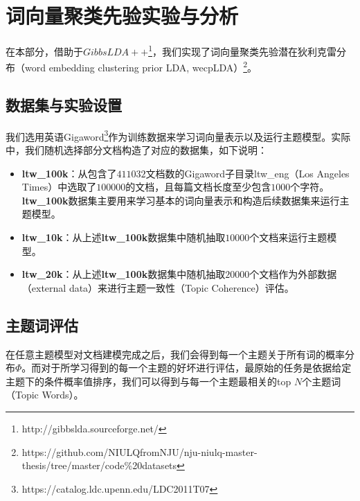 \documentclass[master]{njuthesis}
\begin{document}
\section{词向量聚类先验实验与分析}\label{sec_exp_priorLDA_chap5}

在本部分，借助于$GibbsLDA++$\footnote{http://gibbslda.sourceforge.net/}，我们实现了词向量聚类先验潜在狄利克雷分布（word embedding clustering prior LDA, wecpLDA）\footnote{https://github.com/NIULQfromNJU/nju-niulq-master-thesis/tree/master/code\%20datasets}。

\subsection{数据集与实验设置}\label{subsec_exp_priorLDA_datasets_chap5}

我们选用英语Gigaword\footnote{https://catalog.ldc.upenn.edu/LDC2011T07}作为训练数据来学习词向量表示以及运行主题模型。实际中，我们随机选择部分文档构造了对应的数据集，如下说明：

\begin{itemize}
\item \textbf{ltw\_100k}：从包含了$411032$文档数的Gigaword子目录ltw\_eng（Los Angeles Times）中选取了$100000$的文档，且每篇文档长度至少包含$1000$个字符。\textbf{ltw\_100k}数据集主要用来学习基本的词向量表示和构造后续数据集来运行主题模型。
\item \textbf{ltw\_10k}：从上述\textbf{ltw\_100k}数据集中随机抽取$10000$个文档来运行主题模型。
\item \textbf{ltw\_20k}：从上述\textbf{ltw\_100k}数据集中随机抽取$20000$个文档作为外部数据（external data）来进行主题一致性（Topic Coherence）评估。
\end{itemize}

\subsection{主题词评估}\label{subsec_exp_priorLDA_twords_chap5}

在任意主题模型对文档建模完成之后，我们会得到每一个主题关于所有词的概率分布$\Phi$。而对于所学习得到的每一个主题的好坏进行评估，最原始的任务是依据给定主题下的条件概率值排序，我们可以得到与每一个主题最相关的top $N$个主题词（Topic Words）。
\end{document}
